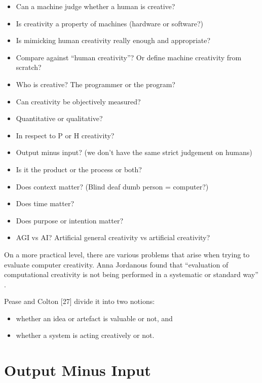 \begin{fcom}
  \begin{itemize}
  \item Can a machine judge whether a human is creative?
  \item Is creativity a property of machines (hardware or software?)
  \item Is mimicking human creativity really enough and appropriate?
  \item Compare against ``human creativity''? Or define machine creativity from scratch?
  \item Who is creative? The programmer or the program?
  \item Can creativity be objectively measured?
  \item Quantitative or qualitative?
  \item In respect to P or H creativity?
  \item Output minus input? (we don’t have the same strict judgement on humans)
  \item Is it the product or the process or both?
  \item Does context matter? (Blind deaf dumb person = computer?)
  \item Does time matter?
  \item Does purpose or intention matter?
  \item AGI vs AI? Artificial general creativity vs artificial creativity?
  \end{itemize}
\end{fcom}

On a more practical level, there are various problems that arise when trying to evaluate computer creativity. Anna Jordanous found that ``evaluation of computational creativity is not being performed in a systematic or standard way'' \parencite[p.2, her emphasis]{Jordanous2011}.

Pease and Colton [27] divide it into two notions: 

\begin{itemize}
  \item whether an idea or artefact is valuable or not, and
  \item whether a system is acting creatively or not.
\end{itemize}


\section{Output Minus Input}


